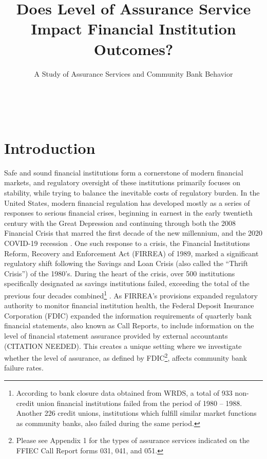 \documentclass[12pt,letterpaper]{article}
\makeatletter
\renewcommand{\maketitle}{\bgroup
   \begin{center}
   \textbf{{\fontsize{18pt}{20}\selectfont \@title}}\\
   \vspace{10pt}
   {\fontsize{12pt}{0}\selectfont \@author} 
   \end{center}
}
\makeatother
\begin{document}
\title{Does Level of Assurance Service Impact Financial Institution Outcomes?}
\author{A Study of Assurance Services and Community Bank Behavior}
\maketitle
\thispagestyle{fancy}

\section*{Introduction}

Safe and sound financial institutions form a cornerstone of modern financial markets, and regulatory oversight of these institutions primarily focuses on stability, while trying to balance the inevitable costs of regulatory burden. In the United States, modern financial regulation has developed mostly as a series of responses to serious financial crises, beginning in earnest in the early twentieth century with the Great Depression and continuing through both the 2008 Financial Crisis that marred the first decade of the new millennium, and the 2020 COVID-19 recession \parencite{KandracMarsh2025}. One such response to a crisis, the Financial Institutions Reform, Recovery and Enforcement Act (FIRREA) of 1989, marked a significant regulatory shift following the Savings and Loan Crisis (also called the ``Thrift Crisis'') of the 1980's. During the heart of the crisis, over 500 institutions specifically designated as savings institutions failed, exceeding the total of the previous four decades combined\footnote{According to bank closure data obtained from WRDS, a total of 933 non-credit union financial institutions failed from the period of 1980 -- 1988. Another 226 credit unions, institutions which fulfill similar market functions as community banks, also failed during the same period.} \parencite{ClarkMurtaghCorcoran1989}. As FIRREA's provisions expanded regulatory authority to monitor financial institution health, the Federal Deposit Insurance Corporation (FDIC) expanded the information requirements of quarterly bank financial statements, also known as Call Reports, to include information on the level of financial statement assurance provided by external accountants (CITATION NEEDED). This creates a unique setting where we investigate whether the level of assurance, as defined by FDIC\footnote{Please see Appendix 1 for the types of assurance services indicated on the FFIEC Call Report forms 031, 041, and 051.}, affects community bank failure rates.
\end{document}
